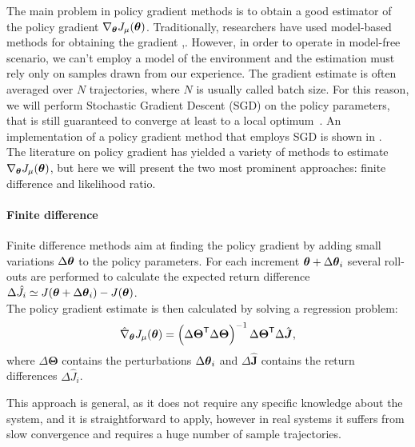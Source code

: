 \newcommand{\gradjhat}{\hat{\nabla}_{\vtheta}J_{\mu}(\vtheta)}
\newcommand{\elig}[1][\vtheta]{\nabla_{#1}\log\pi_{#1}(a|s)}

The main problem in policy gradient methods is to obtain a good estimator of the policy gradient $\nabla_{{\boldsymbol{\theta}}}J_\mu({\boldsymbol{\theta}})$. Traditionally, researchers have used model-based methods for obtaining the gradient \cite{dyer1970computation},\cite{hasdorff1976gradient}. However, in order to operate in model-free scenario, we can't employ a model of the environment and the estimation must rely only on samples drawn from our experience. The gradient estimate is often averaged over $N$ trajectories, where $N$ is usually called batch size. For this reason, we will perform Stochastic Gradient Descent (SGD) on the policy parameters, that is still guaranteed to converge at least to a local optimum~\cite{kiefer1952}. An implementation of a policy gradient method that employs SGD is shown in .\\
The literature on policy gradient has yielded a variety of methods to estimate $\nabla_{{\boldsymbol{\theta}}}J_\mu({\boldsymbol{\theta}})$, but here we will present the two most prominent approaches: finite difference and likelihood ratio.
%
\paragraph{Finite difference}
Finite difference methods aim at finding the policy gradient by adding small variations $\Delta{\boldsymbol{\theta}}$ to the policy parameters. For each increment ${\boldsymbol{\theta}} + \Delta{\boldsymbol{\theta}}_i$ several roll-outs are performed to calculate the expected return difference $\Delta\hat{J}_i \simeq J({\boldsymbol{\theta}} + \Delta{\boldsymbol{\theta}}_i) - J({\boldsymbol{\theta}})$.\\
The policy gradient estimate is then calculated by solving a regression problem:
\[
\hat{\nabla}_{{\boldsymbol{\theta}}}J_\mu({\boldsymbol{\theta}}) = \left({\Delta\boldsymbol{\Theta}}^{\mathsf{T}}\Delta\boldsymbol{\Theta}\right)^{-1}{\Delta\boldsymbol{\Theta}}^{\mathsf{T}}\Delta\hat{\boldsymbol{J}},
\]
where $\Delta\boldsymbol{\Theta}$ contains the perturbations $\Delta{\boldsymbol{\theta}}_i$ and $\Delta\hat{\boldsymbol{J}}$ contains the return differences $\Delta\hat{J}_i$.

This approach is general, as it does not require any specific knowledge about the system, and it is straightforward to apply, however in real systems it suffers from slow convergence and requires a huge number of sample trajectories.

